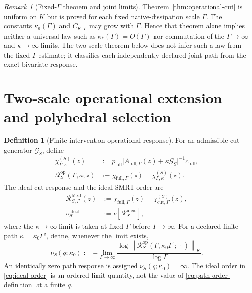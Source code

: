 \documentclass[11pt]{article}
\theoremstyle{definition}
\newtheorem{definition}[theorem]{Definition}
\theoremstyle{remark}
\newtheorem{remark}[theorem]{Remark}
\theoremstyle{plain}
\newcommand{\R}{\mathcal R}
\newcommand{\normK}[1]{\left\lVert #1\right\rVert_{K}}
\newcommand{\full}{\mathrm{full}}
\newcommand{\cut}{\mathrm{cut}}
\newcommand{\Gcut}{\mathcal G}
\newcommand{\op}{\mathrm{op}}
\newcommand{\ideal}{\mathrm{ideal}}
\begin{document}
\begin{remark}[Fixed-$\Gamma$ theorem and joint limits]\label{rem:joint-limit}
Theorem~\ref{thm:operational-cut} is uniform on $K$ but is proved for each fixed native-dissipation scale $\Gamma$.  The constants $\kappa_0(\Gamma)$ and $C_{K,\Gamma}$ may grow with $\Gamma$.  Hence that theorem alone implies neither a universal law such as $\kappa_*(\Gamma)=O(\Gamma)$ nor commutation of the $\Gamma\to\infty$ and $\kappa\to\infty$ limits.  The two-scale theorem below does not infer such a law from the fixed-$\Gamma$ estimate; it classifies each independently declared joint path from the exact bivariate response.
\end{remark}

\section{Two-scale operational extension and polyhedral selection}
\label{sec:two-scale}

\begin{definition}[Finite-intervention operational response]\label{def:finite-op}
For an admissible cut generator $\Gcut_S$, define
\begin{align}
 \chi_{\Gamma,\kappa}^{(S)}(z)
 &:=p_{\full}^{\dagger}
 \bigl[A_{\full,\Gamma}(z)+\kappa\Gcut_S\bigr]^{-1}c_{\full},\\
 \R_S^{\op}(\Gamma,\kappa;z)
 &:=\chi_{\full,\Gamma}(z)-\chi_{\Gamma,\kappa}^{(S)}(z).
 \label{eq:finite-op-response}
\end{align}
The ideal-cut response and the ideal SMRT order are
\begin{align}
 \R_{S,\Gamma}^{\ideal}(z)
 &:=\chi_{\full,\Gamma}(z)-\chi_{\cut,\Gamma}^{(S)}(z),\\
 \nu_S^{\ideal}
 &:=\nu[\R_S^{\ideal}],
 \label{eq:ideal-order}
\end{align}
where the $\kappa\to\infty$ limit is taken at fixed $\Gamma$ before
$\Gamma\to\infty$.  For a declared finite path
$\kappa=\kappa_0\Gamma^q$, define, whenever the limit exists,
\begin{equation}\label{eq:path-order-definition}
 \nu_S(q;\kappa_0)
 :=-\lim_{\Gamma\to\infty}
 \frac{\log\normK{\R_S^{\op}
 (\Gamma,\kappa_0\Gamma^q;\,\cdot)}}{\log\Gamma}.
\end{equation}
An identically zero path response is assigned $\nu_S(q;\kappa_0)=\infty$.
The ideal order in \eqref{eq:ideal-order} is an ordered-limit quantity, not
the value of \eqref{eq:path-order-definition} at a finite $q$.
\end{definition}
\end{document}
